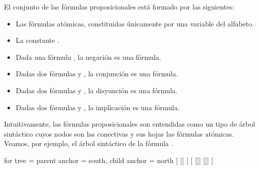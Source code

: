 \begin{isabellebody}
\begin{isamarkuptext}
  \begin{definicion}
    El conjunto de las fórmulas proposicionales está formado por las 
    siguientes:
    \begin{itemize}
      \item Las fórmulas atómicas, constituidas únicamente por una 
        variable del alfabeto. 
      \item La constante \isa{{\isasymbottom}}.
      \item Dada una fórmula , la negación  es una fórmula.
      \item Dadas dos fórmulas  y , la conjunción  es una
        fórmula.
      \item Dadas dos fórmulas  y , la disyunción  es una
        fórmula.
      \item Dadas dos fórmulas  y , la implicación  es 
        una fórmula.
    \end{itemize}
  \end{definicion}

  Intuitivamente, las fórmulas proposicionales son entendidas como un 
  tipo de árbol sintáctico cuyos nodos son las conectivas y sus hojas
  las fórmulas atómicas. Veamos, por ejemplo, el árbol sintáctico de
  la fórmula .

 \begin{forest} for tree = {parent anchor = south, child anchor = north}
        [
            []
            [
                [
                  []]
                []]
        ]
 \end{forest}


\end{isamarkuptext}
\end{isabellebody}
